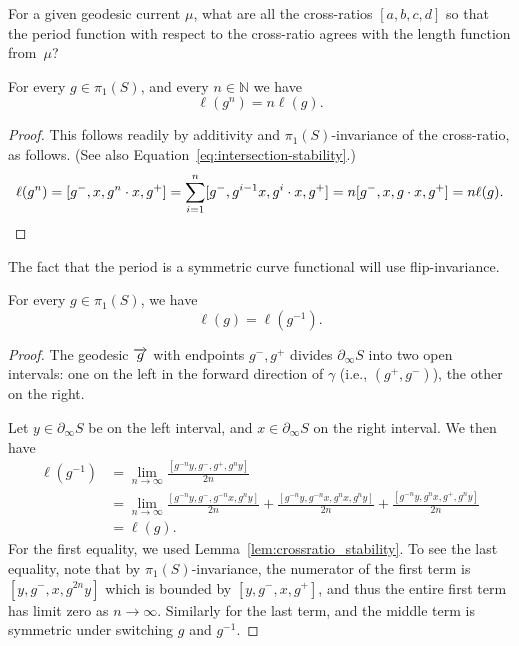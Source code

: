 \begin{question}
  For a given geodesic current $\mu$, what are all the cross-ratios
  $[a,b,c,d]$ so that the period function with respect to the
  cross-ratio agrees with the length function from~$\mu$?
  \label{que:howmany_crossratios}
\end{question}

\begin{lemma}
\label{lem:crossratio_stability}
For every $g \in \pi_1(S)$, and every $n \in \mathbb{N}$ we have
\[
\ell(g^n) = n\ell(g).
\]
\end{lemma}
\begin{proof}

This follows readily by additivity and $\pi_1(S)$-invariance of the
cross-ratio, as follows. (See also Equation~\eqref{eq:intersection-stability}.)
\begin{equation}\label{eq:crossratio-stability}
 \ell(g^n) =[g^-, x , g^n \cdot x, g^+]= \sum_{i=1}^{n} [g^-, g^{i-1}x , g^i \cdot x, g^+] = n[g^-, x , g \cdot x, g^+] = n \ell(g).\qedhere
\end{equation}
\end{proof}

The fact that the period is a symmetric curve functional will use flip-invariance. 

\begin{lemma}    \label{lem:crinv}
    For every $g \in \pi_1(S)$, we have
    \[
    \ell(g)=\ell(g^{-1}).
    \]
\end{lemma}
\begin{proof}
The geodesic $\overrightarrow{g}$ with endpoints $g^-, g^+$ divides $\partial_{\infty}S$ into two open intervals:
one on the left in the forward direction of $\gamma$ (i.e.,
$(g^+,g^-)$), the other on the right.

Let $y \in  \partial_{\infty}S$ be on the left interval, and $x \in  \partial_{\infty}S$ on the right interval.
We then have
\begin{align*}
\ell(g^{-1}) &= \lim_{n \to \infty} \frac{[g^{-n}y, g^-, g^+, g^{n} y]}{2n} \\
  &= \lim_{n \to \infty}
     \frac{[g^{-n}y, g^-, g^{-n}x, g^{n} y]}{2n} +
     \frac{[g^{-n}y, g^{-n}x, g^{n}x, g^{n} y]}{2n} +
     \frac{[g^{-n}y, g^{n}x, g^+, g^{n} y]}{2n}\\
  &= \ell(g).
\end{align*}
For the first equality, we used Lemma~\ref{lem:crossratio_stability}.
To see the last equality, note that by $\pi_1(S)$-invariance, the
numerator of the first term is $[y,g^-,x,g^{2n}y]$ which is bounded by
$[y,g^-,x,g^+]$, and thus the entire first term has limit zero
as $n \to \infty$. Similarly for the last term, and the middle term is
symmetric under switching $g$ and $g^{-1}$.
\end{proof}

